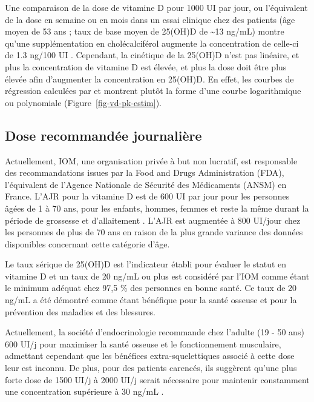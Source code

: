 \documentclass[
  a4paper,
  DIV=11,
  numbers=noendperiod,
  listof=totoc]{scrreprt}
\begin{document}
Une comparaison de la dose de vitamine D pour 1000 UI par jour, ou
l'équivalent de la dose en semaine ou en mois dans un essai clinique
chez des patients (âge moyen de 53 ans ; taux de base moyen de 25(OH)D
de \textasciitilde13 ng/mL) montre qu'une supplémentation en
cholécalciférol augmente la concentration de celle-ci de 1.3 ng/100 UI
\autocite{Bouillon.2017}. Cependant, la cinétique de la 25(OH)D n'est
pas linéaire, et plus la concentration de vitamine D est élevée, et plus
la dose doit être plus élevée afin d'augmenter la concentration en
25(OH)D. En effet, les courbes de régression calculées par
\textcite{Veugelers.2014} et \textcite{Heaney.2015} montrent plutôt la
forme d'une courbe logarithmique ou polynomiale
(Figure~\ref{fig-vd-pk-estim}).

\hypertarget{dose-recommanduxe9e-journaliuxe8re}{%
\subsection{Dose recommandée
journalière}\label{dose-recommanduxe9e-journaliuxe8re}}

Actuellement, \ac{IOM}, une organisation privée à but non lucratif, est
responsable des recommandations issues par la Food and Drugs
Administration (FDA), l'équivalent de l'Agence Nationale de Sécurité des
Médicaments (ANSM) en France. L'\ac{AJR} pour la vitamine D est de 600
UI par jour pour les personnes âgées de 1 à 70 ans, pour les enfants,
hommes, femmes et reste la même durant la période de grossesse et
d'allaitement \autocite{IOM.2011.org}. L'AJR est augmentée à 800 UI/jour
chez les personnes de plus de 70 ans en raison de la plus grande
variance des données disponibles concernant cette catégorie d'âge.

Le taux sérique de 25(OH)D est l'indicateur établi pour évaluer le
statut en vitamine D et un taux de 20 ng/mL ou plus est considéré par
l'IOM comme étant le minimum adéquat chez 97,5 \% des personnes en bonne
santé. Ce taux de 20 ng/mL a été démontré comme étant bénéfique pour la
santé osseuse et pour la prévention des maladies et des blessures.

Actuellement, la société d'endocrinologie recommande chez l'adulte (19 -
50 ans) 600 UI/j pour maximiser la santé osseuse et le fonctionnement
musculaire, admettant cependant que les bénéfices extra-squelettiques
associé à cette dose leur est inconnu. De plus, pour des patients
carencés, ils suggèrent qu'une plus forte dose de 1500 UI/j à 2000 UI/j
serait nécessaire pour maintenir constamment une concentration
supérieure à 30 ng/mL \autocite{Holick.2011}.
\end{document}
